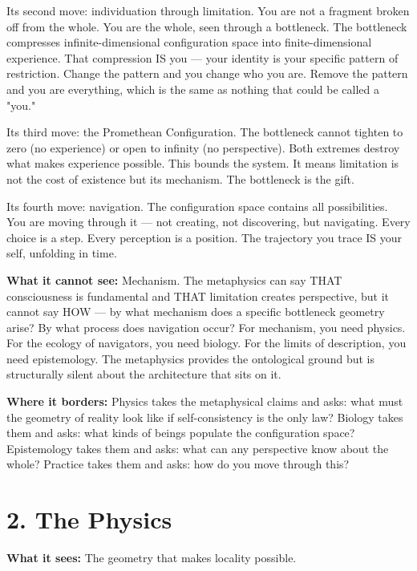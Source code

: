 Its second move: individuation through limitation. You are not a fragment broken off from the whole. You are the whole, seen through a bottleneck. The bottleneck compresses infinite-dimensional configuration space into finite-dimensional experience. That compression IS you — your identity is your specific pattern of restriction. Change the pattern and you change who you are. Remove the pattern and you are everything, which is the same as nothing that could be called a "you."


Its third move: the Promethean Configuration. The bottleneck cannot tighten to zero (no experience) or open to infinity (no perspective). Both extremes destroy what makes experience possible. This bounds the system. It means limitation is not the cost of existence but its mechanism. The bottleneck is the gift.


Its fourth move: navigation. The configuration space contains all possibilities. You are moving through it — not creating, not discovering, but navigating. Every choice is a step. Every perception is a position. The trajectory you trace IS your self, unfolding in time.


\textbf{What it cannot see:} Mechanism. The metaphysics can say THAT consciousness is fundamental and THAT limitation creates perspective, but it cannot say HOW — by what mechanism does a specific bottleneck geometry arise? By what process does navigation occur? For mechanism, you need physics. For the ecology of navigators, you need biology. For the limits of description, you need epistemology. The metaphysics provides the ontological ground but is structurally silent about the architecture that sits on it.


\textbf{Where it borders:} Physics takes the metaphysical claims and asks: what must the geometry of reality look like if self-consistency is the only law? Biology takes them and asks: what kinds of beings populate the configuration space? Epistemology takes them and asks: what can any perspective know about the whole? Practice takes them and asks: how do you move through this?


\bigskip\noindent\makebox[\textwidth]{\color{rulegray}\rule{5cm}{0.3pt}}\bigskip


\section*{2. The Physics}


\textbf{What it sees:} The geometry that makes locality possible.


